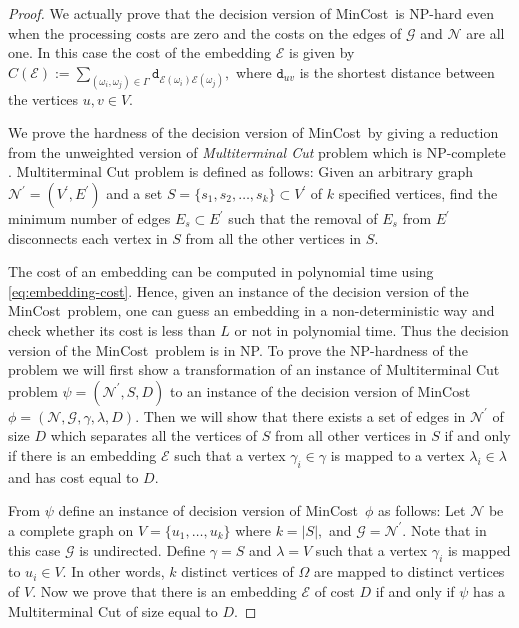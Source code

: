 \documentclass[journal]{IEEEtran}
\newcommand{\net}{\mathcal{N}}
\newcommand{\netnodes}{V}
\newcommand{\netedges}{E}
\newcommand{\compgraph}{\mathcal{G}}
\newcommand{\compnodes}{\Omega}
\newcommand{\compedges}{\Gamma}
\newcommand{\distance}{\mathtt{d}} \newcommand{\edgewt}{\mathtt{W}} \newcommand{\processingwt}{\mathtt{P}}
\newcommand{\mincost}{\textsf{MinCost}}
\newcommand{\embedding}{\mathcal{E}}
\begin{document}
\begin{proof}
  We actually prove that the decision version of \mincost\ is NP-hard
  even when the processing costs are zero and the costs on the edges
  of $\compgraph$ and $\net$ are all one. In this case the cost of the
  embedding $\embedding$ is given by $C(\embedding) := \sum_{(\omega_i,\omega_j) \in \compedges} \distance_{\embedding(\omega_i)\embedding(\omega_j)},$
  where $\distance_{uv}$ is the shortest distance between the vertices
  $u,v \in \netnodes.$

  We prove the hardness of the decision version of \mincost\ by giving
  a reduction from the unweighted version of \textit{Multiterminal
    Cut} problem which is NP-complete \cite{Dahlhaus94}.
  Multiterminal Cut problem is defined as follows: Given an arbitrary
  graph $\net^{\prime} = (\netnodes^{\prime},\netedges^{\prime})$ and
  a set $S = \{s_1,s_2,\ldots,s_k\} \subset \netnodes^{\prime}$ of $k$
  specified vertices, find the minimum number of edges $\netedges_s
  \subset \netedges^{\prime}$ such that the removal of $\netedges_s$
  from $\netedges^{\prime}$ disconnects each vertex in $S$ from all
  the other vertices in $S.$

  The cost of an embedding can be computed in polynomial time using
  \eqref{eq:embedding-cost}. Hence, given an instance of the decision
  version of the \mincost\ problem, one can guess an embedding in a
  non-deterministic way and check whether its cost is less than $L$ or
  not in polynomial time. Thus the decision version of the \mincost\
  problem is in NP. To prove the NP-hardness of the problem we will
  first show a transformation of an instance of Multiterminal Cut
  problem $\psi = (\net^{\prime},S,D)$ to an instance of the decision
  version of \mincost\ $\phi=(\net,\compgraph,\gamma,\lambda,D).$ Then
  we will show that there exists a set of edges in $\net^{\prime}$ of
  size $D$ which separates all the vertices of $S$ from all other
  vertices in $S$ if and only if there is an embedding $\embedding$
  such that a vertex $\gamma_i \in \gamma$ is mapped to a vertex
  $\lambda_i \in \lambda$ and has cost equal to $D.$

  From $\psi$ define an instance of decision version of \mincost\
  $\phi$ as follows: Let $\net$ be a complete graph on $\netnodes=
  \{u_1,\ldots,u_k\}$ where $k=|S|,$ and $\compgraph = \net^{\prime}.$
  Note that in this case $\compgraph$ is undirected. Define
  $\gamma=S$ and $\lambda = \netnodes$ such that a vertex $\gamma_i$
  is mapped to $u_i \in \netnodes.$ In other words, $k$ distinct
  vertices of $\compnodes$ are mapped to distinct vertices of
  $\netnodes.$ Now we prove that there is an embedding $\embedding$ of
  cost $D$ if and only if $\psi$ has a Multiterminal Cut of size equal
  to $D.$


\end{proof}
\end{document}
